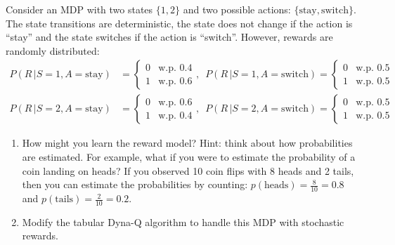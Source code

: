 Consider an MDP with two states $\{1,2\}$ and two possible actions: $\{\text{stay}, \text{switch}\}$.
The state transitions are deterministic, the state does not change if the action is ``stay'' and the state switches if the action is ``switch''.
However, rewards are randomly distributed:
\begin{align*}
  P(R\, | S = 1, A = \text{stay}) &= \begin{cases}
  0 & \text{w.p. 0.4}\\
  1 & \text{w.p. 0.6}
  \end{cases} , \,\,\,
P(R\, | S = 1, A = \text{switch}) = \begin{cases}
  0 & \text{w.p. 0.5}\\
  1 & \text{w.p. 0.5}
\end{cases}\\
 P(R \,| S = 2, A = \text{stay}) &= \begin{cases}
  0 & \text{w.p. 0.6}\\
  1 & \text{w.p. 0.4}
  \end{cases} , \,\,\,
P(R \,| S = 2, A = \text{switch}) = \begin{cases}
  0 & \text{w.p. 0.5}\\
  1 & \text{w.p. 0.5}
\end{cases}
\end{align*}
\begin{enumerate}
  \item  How might you learn the reward model? Hint: think about how probabilities are estimated. For example, what if you were to estimate the probability of a coin landing on heads? If you observed 10 coin flips with 8 heads and 2 tails, then you can estimate the probabilities by counting: $p(\text{heads}) = \frac{8}{10} = 0.8$ and $p(\text{tails}) = \frac{2}{10} = 0.2$.
  \item Modify the tabular Dyna-Q algorithm to handle this MDP with stochastic rewards.
\end{enumerate}

